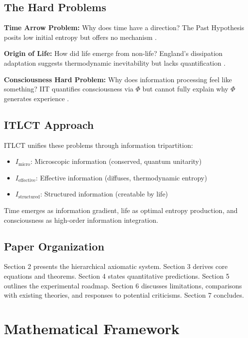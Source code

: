 \documentclass[12pt,a4paper]{article}
\begin{document}
\subsection{The Hard Problems}

\textbf{Time Arrow Problem:} Why does time have a direction? The Past Hypothesis posits low initial entropy but offers no mechanism \citep{carroll2010eternity}.

\textbf{Origin of Life:} How did life emerge from non-life? England's dissipation adaptation suggests thermodynamic inevitability but lacks quantification \citep{england2013statistical}.

\textbf{Consciousness Hard Problem:} Why does information processing feel like something? IIT quantifies consciousness via $\Phi$ but cannot fully explain why $\Phi$ generates experience \citep{tononi2004information,chalmers1995facing}.

\subsection{ITLCT Approach}

ITLCT unifies these problems through information tripartition:
\begin{itemize}
\item $I_{\text{micro}}$: Microscopic information (conserved, quantum unitarity)
\item $I_{\text{effective}}$: Effective information (diffuses, thermodynamic entropy)
\item $I_{\text{structured}}$: Structured information (creatable by life)
\end{itemize}

Time emerges as information gradient, life as optimal entropy production, and consciousness as high-order information integration.

\subsection{Paper Organization}

Section 2 presents the hierarchical axiomatic system. Section 3 derives core equations and theorems. Section 4 states quantitative predictions. Section 5 outlines the experimental roadmap. Section 6 discusses limitations, comparisons with existing theories, and responses to potential criticisms. Section 7 concludes.

\section{Mathematical Framework}
\end{document}
